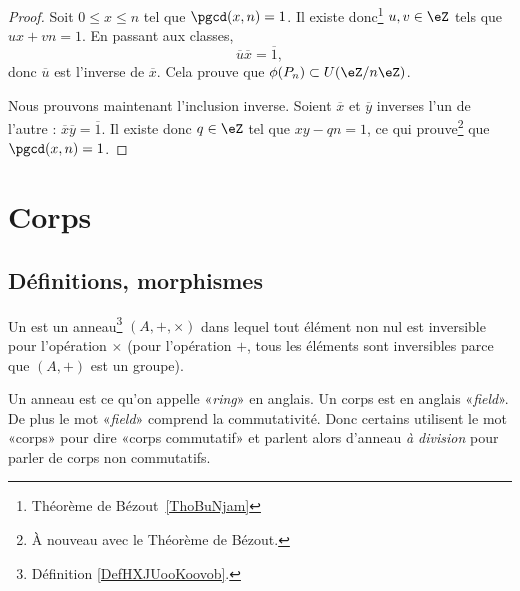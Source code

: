 \begin{proof}
    Soit \( 0\leq x\leq n\) tel que \( \pgcd(x,n)=1\). Il existe donc\footnote{Théorème de Bézout~\ref{ThoBuNjam}} \( u,v\in\eZ\) tels que \( ux+vn=1\). En passant aux classes,
    \begin{equation}
        \overline u\overline x=\overline 1,
    \end{equation}
    donc \( \overline u\) est l'inverse de \( \overline x\). Cela prouve que \( \phi(P_n)\subset U(\eZ/n\eZ)\).

    Nous prouvons maintenant l'inclusion inverse. Soient \( \overline x\) et \( \overline y\) inverses l'un de l'autre : $\overline x\overline y=\overline 1$. Il existe donc \( q\in\eZ\) tel que \( xy-qn=1\), ce qui prouve\footnote{À nouveau avec le Théorème de Bézout.} que \( \pgcd(x,n)=1\).
\end{proof}

\section{Corps}

\subsection{Définitions, morphismes}

\begin{definition}  \label{DefTMNooKXHUd}
    Un  est un anneau\footnote{Définition \ref{DefHXJUooKoovob}.} \( (A, +,\times)\) dans lequel tout élément non nul est inversible pour l'opération \( \times\) (pour l'opération \( +\), tous les éléments sont inversibles parce que \( (A,+)\) est un groupe).
\end{definition}

\begin{remark}      \label{REMooYRNUooYgBBKF}
    Un anneau est ce qu'on appelle «\emph{ring}» en anglais. Un corps est en anglais «\emph{field}». De plus le mot «\emph{field}» comprend la commutativité. Donc certains utilisent le mot «corps» pour dire «corps commutatif» et parlent alors d'anneau \emph{à division} pour parler de corps non commutatifs.
\end{remark}


